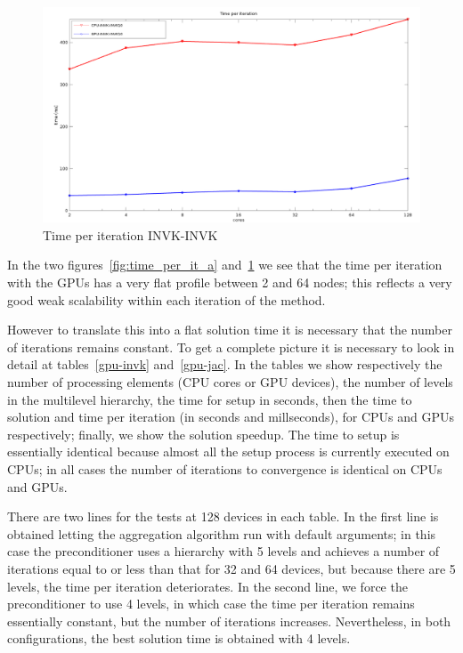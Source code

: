 \begin{figure}[h!]
\centering
\includegraphics[width=1\textwidth]{graf_time_per_it3b.png}
\caption{Time per iteration INVK-INVK\label{fig:time_per_it_b}}
\end{figure}

In the two figures~\ref{fig:time_per_it_a} and~\ref{fig:time_per_it_b}
we see that the time per iteration with the GPUs has a very flat profile between 2
and 64 nodes; this reflects a very good weak scalability within each
iteration of the method.

 However to translate this into a flat
solution time it is necessary that the number of iterations remains
constant. To get a complete picture it is necessary to look in detail
at  tables~\ref{gpu-invk} and~\ref{gpu-jac}. In the tables we show
respectively the number of processing elements (CPU cores or GPU
devices), the number of levels in the multilevel hierarchy, the time
for setup in seconds, then the time to solution and time per iteration
(in seconds and millseconds), for CPUs and GPUs respectively; finally,
we show the solution speedup. The time 
to setup is essentially identical because  almost all the
setup process is currently executed  on CPUs; in all cases the number
of iterations to convergence is identical on CPUs and GPUs. 

There are two lines for the tests at 128 devices in each table. In
the first line is obtained letting the aggregation algorithm run with
default arguments; in this case the preconditioner uses a hierarchy
with 5 levels and achieves a number of iterations equal to or less than
that for 32 and 64 devices, but because there are 5 levels, the time
per iteration deteriorates.  In the second line, we force the
preconditioner to use 4 levels, in which case the time per iteration
remains essentially constant, but the number of iterations
increases. Nevertheless, in both configurations, the best solution
time is obtained with 4 levels. 

